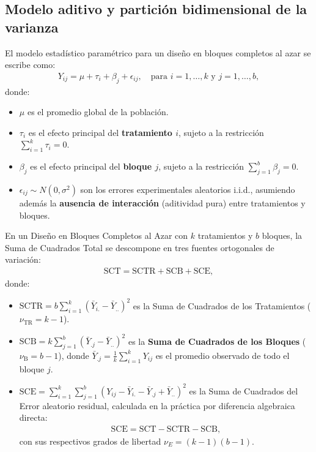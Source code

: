 \subsection{Modelo aditivo y partición bidimensional de la varianza}

El modelo estadístico paramétrico para un diseño en bloques completos al azar se escribe como:
\begin{align}
	Y_{ij} = \mu + \tau_i + \beta_j + \epsilon_{ij}, \quad \text{para } i = 1, \ldots, k \text{ y } j = 1, \ldots, b,
	\label{eq:modelo_dbca}
\end{align}
donde:
\begin{itemize}
	\item $\mu$ es el promedio global de la población.
	\item $\tau_i$ es el efecto principal del \textbf{tratamiento $i$}, sujeto a la restricción $\sum_{i=1}^k \tau_i = 0$.
	\item $\beta_j$ es el efecto principal del \textbf{bloque $j$}, sujeto a la restricción $\sum_{j=1}^b \beta_j = 0$.
	\item $\epsilon_{ij} \sim N(0, \sigma^2)$ son los errores experimentales aleatorios i.i.d., asumiendo además la \textbf{ausencia de interacción} (aditividad pura) entre tratamientos y bloques.
\end{itemize}

\begin{teorema}
	En un Diseño en Bloques Completos al Azar con $k$ tratamientos y $b$ bloques, la Suma de Cuadrados Total se descompone en tres fuentes ortogonales de variación:
	\begin{align}
		\text{SCT} = \text{SCTR} + \text{SCB} + \text{SCE},
	\end{align}
	donde:
	\begin{itemize}
		\item $\text{SCTR} = b \sum_{i=1}^k (\bar{Y}_{i.} - \bar{Y}_{..})^2$ es la Suma de Cuadrados de los Tratamientos ($\nu_{\text{TR}} = k - 1$).
		\item $\text{SCB} = k \sum_{j=1}^b (\bar{Y}_{.j} - \bar{Y}_{..})^2$ es la \textbf{Suma de Cuadrados de los Bloques} ($\nu_{\text{B}} = b - 1$), donde $\bar{Y}_{.j} = \frac{1}{k}\sum_{i=1}^k Y_{ij}$ es el promedio observado de todo el bloque $j$.
		\item $\text{SCE} = \sum_{i=1}^k \sum_{j=1}^b (Y_{ij} - \bar{Y}_{i.} - \bar{Y}_{.j} + \bar{Y}_{..})^2$ es la Suma de Cuadrados del Error aleatorio residual, calculada en la práctica por diferencia algebraica directa:
		\begin{align}
			\text{SCE} = \text{SCT} - \text{SCTR} - \text{SCB},
		\end{align}
		con sus respectivos grados de libertad $\nu_E = (k - 1)(b - 1)$.
	\end{itemize}
\end{teorema}

